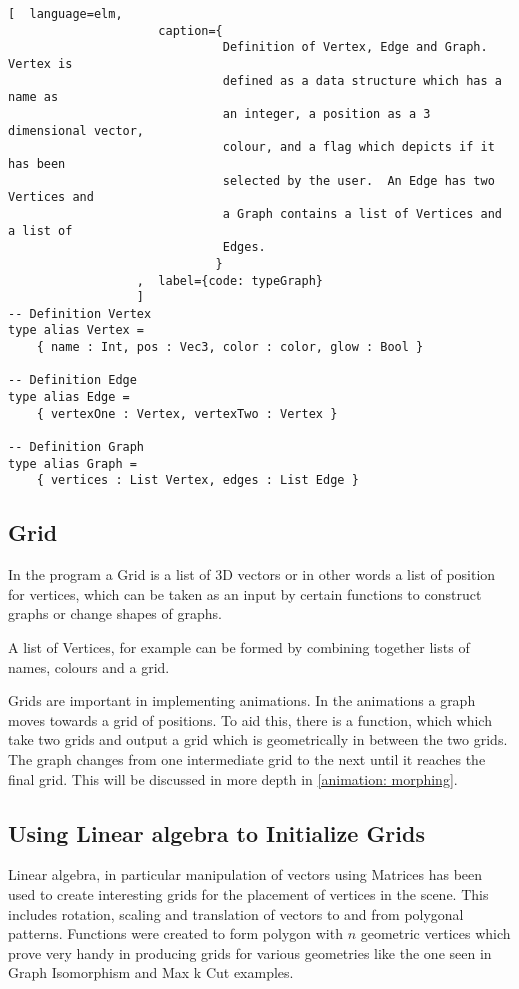 \begin{lstlisting}[  language=elm, 
                     caption={
                              Definition of Vertex, Edge and Graph.  Vertex is
                              defined as a data structure which has a name as
                              an integer, a position as a 3 dimensional vector,
                              colour, and a flag which depicts if it has been
                              selected by the user.  An Edge has two Vertices and
                              a Graph contains a list of Vertices and a list of
                              Edges.
                             }
                  ,  label={code: typeGraph}
                  ]
-- Definition Vertex
type alias Vertex =
    { name : Int, pos : Vec3, color : color, glow : Bool }

-- Definition Edge
type alias Edge =
    { vertexOne : Vertex, vertexTwo : Vertex }

-- Definition Graph
type alias Graph =
    { vertices : List Vertex, edges : List Edge }
\end{lstlisting}

\subsection{Grid}
In the program a Grid is a list of 3D vectors or in other words a list of
position for vertices, which can be taken as an input by certain functions to
construct graphs or change shapes of graphs. 

A list of Vertices, for example can be formed by combining together lists of
names, colours and a grid.

Grids are important in implementing animations. In the animations a graph moves
towards a grid of positions. To aid this, there is a function, which which take
two grids and output a grid which is geometrically in between the two grids.
The graph changes from one intermediate grid to the next until it
reaches the final grid. This will be discussed in more depth in \autoref{animation:
morphing}.

\subsection{Using Linear algebra to Initialize Grids}
Linear algebra, in particular manipulation of vectors using Matrices has been
used to create interesting grids for the placement of vertices in the scene.
This includes rotation, scaling and translation of vectors to and from polygonal
patterns. Functions were created to form polygon with $n$ geometric vertices
which prove very handy in producing grids for various geometries like
the one seen in Graph Isomorphism and Max k Cut examples.

